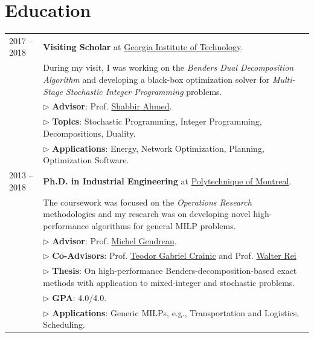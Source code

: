 \documentclass[10PT,letter]{article}
\newcommand{\numbox}[1]{} %
\begin{document}
\section*{\numbox{2}\bfseries\textcolor{titlecol}{\sffamily Education}}
        \begin{tabular}{lp{5.5in}}
	            \textsc{2017 -- 2018} & \textbf{Visiting Scholar} at \href{https://www.isye.gatech.edu}{Georgia Institute of Technology}.
	            \\[.5mm]
	            & During my visit, I was working on  the \textit{Benders Dual Decomposition Algorithm} and  developing a black-box optimization solver for  \textit{Multi-Stage Stochastic Integer Programming} problems.\\[.5mm]
	            & $\triangleright$ {\small\textbf{Advisor}}:  Prof. \href{https://www2.isye.gatech.edu/people/faculty/Shabbir_Ahmed/}{Shabbir Ahmed}.\\[1.1mm]
	            & $\triangleright$ {\small\textbf{Topics}}: Stochastic Programming, Integer Programming, Decompositions, Duality.\\
	            & $\triangleright$ {\small\textbf{Applications}}: Energy, Network Optimization, Planning, Optimization Software.\\[4mm]
	            \textsc{2013 -- 2018} & \textbf{Ph.D. in Industrial Engineering} at \href{https://www.polymtl.ca/magi/}{Polytechnique of Montreal}.\\[.5mm]
	            & The coursework was   focused on the \textit{Operations Research} methodologies and my research was  on developing novel high-performance algorithms for general MILP problems.\\[.5mm]
	            & $\triangleright$ {\small\textbf{Advisor}}:  Prof. \href{https://www.polymtl.ca/expertises/en/gendreau-michel}{Michel Gendreau}.\\[1.1mm]
	            & $\triangleright$ {\small\textbf{Co-Advisors}}:  Prof. \href{https://professeurs.uqam.ca/professeur?c=crainic.teodor}{Teodor Gabriel Crainic} and Prof. \href{https://professeurs.uqam.ca/professeur?c=rei.walter}{Walter Rei} \\[1.1mm]
	            & $\triangleright$ {\small\textbf{Thesis}}: On high-performance Benders-decomposition-based exact methods with application to mixed-integer and stochastic problems.\\
	            & $\triangleright$ {\small\textbf{GPA}}: 4.0/4.0.\\
	            & $\triangleright$ {\small\textbf{Applications}}: Generic MILPs, e.g., Transportation and Logistics, Scheduling.\\[4mm]

\end{tabular}
\end{document}
